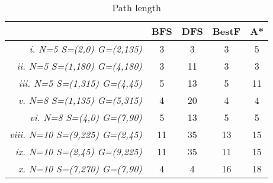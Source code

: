 \begin{table}[ht]
\centering
\begin{tabular}{r|c|c|c|c|}
\cline{2-5}
\multicolumn{1}{l|}{} & \textbf{BFS} & \textbf{DFS} & \textbf{BestF} & \textbf{A*} \\ \hline
\multicolumn{1}{|r|}{\textit{i. N=5 S=(2,0) G=(2,135)}} & 3 & 3 & 3 & 5 \\ \hline
\multicolumn{1}{|r|}{\textit{ii. N=5 S=(1,180) G=(4,180)}} & 3 & 11 & 3 & 3 \\ \hline
\multicolumn{1}{|r|}{\textit{iii. N=5 S=(1,315) G=(4,45)}} & 5 & 13 & 5 & 11 \\ \hline
\multicolumn{1}{|r|}{\textit{v. N=8 S=(1,135) G=(5,315)}} & 4 & 20 & 4 & 4 \\ \hline
\multicolumn{1}{|r|}{\textit{vi. N=8 S=(4,0) G=(7,90)}} & 5 & 13 & 5 & 5 \\ \hline
\multicolumn{1}{|r|}{\textit{viii. N=10 S=(9,225) G=(2,45)}} & 11 & 35 & 13 & 15 \\ \hline
\multicolumn{1}{|r|}{\textit{ix. N=10 S=(2,45) G=(9,225)}} & 11 & 35 & 11 & 15 \\ \hline
\multicolumn{1}{|r|}{\textit{x. N=10 S=(7,270) G=(7,90)}} & 4 & 4 & 16 & 18 \\ \hline
\end{tabular}
\caption{Path length}
\label{tab:path_length}
\end{table}